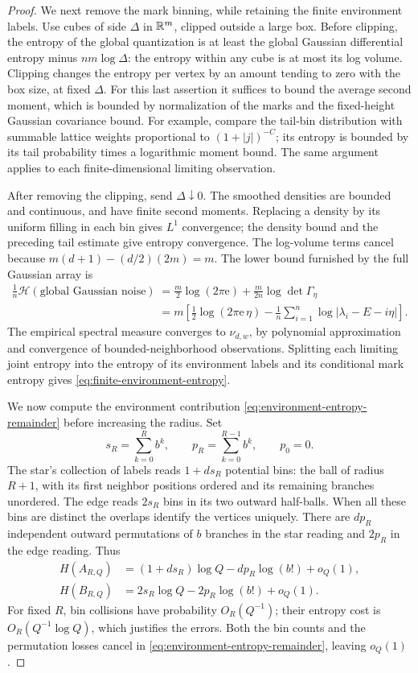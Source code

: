 \begin{proof}
We next remove the mark binning, while retaining the finite
environment labels.  Use cubes of side \(\Delta\) in \(\mathbb R^m\),
clipped outside a large box.  Before clipping, the entropy of the
global quantization is at least the global Gaussian differential
entropy minus \(nm\log\Delta\): the entropy within any cube is at
most its log volume.  Clipping changes the entropy per vertex by
an amount tending to zero with the box size, at fixed \(\Delta\).
For this last assertion it suffices to bound the average second
moment, which is bounded by normalization of the marks and the
fixed-height Gaussian covariance bound.  For example, compare the
tail-bin distribution with summable lattice weights proportional
to \((1+|j|)^{-C}\); its entropy is bounded by its tail probability
times a logarithmic moment bound.  The same argument applies to
each finite-dimensional limiting observation.

After removing the clipping, send \(\Delta\downarrow0\).  The
smoothed densities are bounded and continuous, and have finite
second moments.  Replacing a density by its uniform filling in
each bin gives \(L^1\) convergence; the density bound and the
preceding tail estimate give entropy convergence.  The log-volume
terms cancel because
\(m(d+1)-(d/2)(2m)=m\).  The lower bound furnished by the full
Gaussian array is
\begin{align*}
 \frac1n\mathcal H(\text{global Gaussian noise})
 &=\frac m2\log(2\pi\mathrm e)
       +\frac m{2n}\log\det\Gamma_\eta\\
 &=m\left[\frac12\log(2\pi\mathrm e\,\eta)
       -\frac1n\sum_{i=1}^n\log|\lambda_i-E-i\eta|\right].
\end{align*}
The empirical spectral measure converges to \(\nu_{d,w}\), by
polynomial approximation and convergence of bounded-neighborhood
observations.  Splitting each limiting joint entropy into the entropy of its
environment labels and its conditional mark entropy gives
\eqref{eq:finite-environment-entropy}.

We now compute the environment contribution
\eqref{eq:environment-entropy-remainder} before increasing the radius.  Set
\[
 s_R=\sum_{k=0}^{R}b^k,\qquad p_R=\sum_{k=0}^{R-1}b^k,
 \qquad p_0=0.
\]
The star's collection of labels reads \(1+ds_R\) potential bins:
the ball of radius \(R+1\), with its first neighbor positions
ordered and its remaining branches unordered.  The edge reads
\(2s_R\) bins in its two outward half-balls.  When all these bins
are distinct the overlaps identify the vertices uniquely.  There
are \(dp_R\) independent outward permutations of \(b\) branches
in the star reading and \(2p_R\) in the edge reading.  Thus
\begin{align*}
 H(A_{R,Q})&=(1+ds_R)\log Q-dp_R\log(b!)+o_Q(1),\\
 H(B_{R,Q})&=2s_R\log Q-2p_R\log(b!)+o_Q(1).
\end{align*}
For fixed \(R\), bin collisions have probability \(O_R(Q^{-1})\);
their entropy cost is \(O_R(Q^{-1}\log Q)\), which justifies the
errors.  Both the bin counts and the permutation losses cancel in
\eqref{eq:environment-entropy-remainder}, leaving \(o_Q(1)\).


\end{proof}
